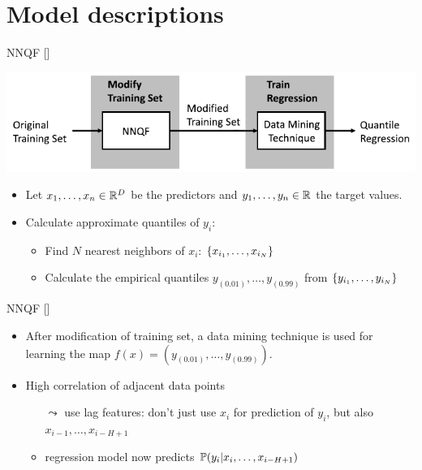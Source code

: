 \documentclass[10pt,aspectratio=169]{beamer}
\begin{document}
\section{Model descriptions}

\begin{frame}{NNQF [\cite{Ordiano2020}]}
    \begin{center}
        \includegraphics{plots/nnqf_approach.pdf}
    \end{center}
    \begin{itemize}
        \item Let \(x_1, \ldots, x_n \in \R^D\) be the predictors and \(y_1, \ldots, y_n\in \R\) the target values.
        \item Calculate approximate quantiles of \(y_i\):
        \begin{itemize}
            \item Find \(N\) nearest neighbors of \(x_i\): \(\set{x_{i_1}, \ldots, x_{i_N}}\)
            \item Calculate the empirical quantiles \(y_{(0.01)}, \ldots, y_{(0.99)}\) from \(\set{y_{i_1}, \ldots, y_{i_N}}\)
        \end{itemize}
    \end{itemize}
\end{frame}

\begin{frame}{NNQF [\cite{Ordiano2020}]}
    \begin{itemize}
        \item After modification of training set, a data mining technique is used for learning the map \(f(x) = (y_{(0.01)}, \ldots, y_{(0.99)})\).
        \item High correlation of adjacent data points
        \begin{itemize}
            \item[\(\leadsto\)] use lag features: don't just use \(x_i\) for prediction of \(y_i\), but also 
            \(x_{i-1}, \ldots, x_{i-H+1}\)
            \item regression model now predicts \( \P(y_i | x_i, \ldots, x_{i-H+1}) \)
        \end{itemize}
    \end{itemize}
\end{frame}
\end{document}

